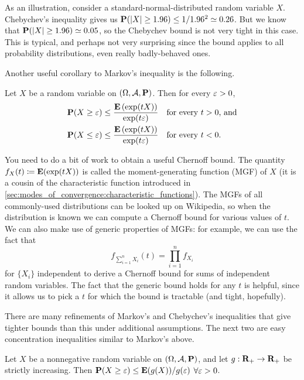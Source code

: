 \documentclass[11pt,letterpaper,reqno,oneside]{article}
\begin{document}
As an illustration, consider a standard-normal-distributed random variable $X$. Chebychev's inequality gives us $\mathbf{P}( \lvert X\rvert \geq 1.96 ) \leq 1/1.96^2 \simeq 0.26$. But we know that $\mathbf{P}( \lvert X\rvert \geq 1.96 ) \simeq 0.05$, so the Chebychev bound is not very tight in this case. This is typical, and perhaps not very surprising since the bound applies to all probability distributions, even really badly-behaved ones.


Another useful corollary to Markov's inequality is the following.
%
\begin{proposition}
	\label{proposition:Chernoff_bounds}
	Let $X$ be a random variable on $(\Omega,\mathcal{A},\mathbf{P})$. Then for every $\varepsilon>0$,
	\begin{align*}
		\mathbf{P}(X \geq \varepsilon) \leq \frac{ \mathbf{E}\left( \exp(tX) \right) }{ \exp(t\varepsilon) }
		&\quad\text{for every $t>0$, and}
		\\
		\mathbf{P}(X \leq \varepsilon) \leq \frac{ \mathbf{E}\left( \exp(tX) \right) }{ \exp(t\varepsilon) }
		&\quad\text{for every $t<0$} .
	\end{align*}
\end{proposition}
%
You need to do a bit of work to obtain a useful Chernoff bound. The quantity $f_X(t) \coloneqq \mathbf{E}(\exp(tX))$ is called the moment-generating function (MGF) of $X$ (it is a cousin of the characteristic function introduced in \cref{sec:modes_of_convergence:characteristic_functions}). The MGFs of all commonly-used distributions can be looked up on Wikipedia, so when the distribution is known we can compute a Chernoff bound for various values of $t$. We can also make use of generic properties of MGFs: for example, we can use the fact that
%
\begin{equation*}
	f_{\sum_{i=1}^n X_i}(t) = \prod_{i=1}^n f_{X_i}
\end{equation*}
%
for $\{ X_i \}$ independent to derive a Chernoff bound for sums of independent random variables. The fact that the generic bound holds for any $t$ is helpful, since it allows us to pick a $t$ for which the bound is tractable (and tight, hopefully).


There are many refinements of Markov's and Chebychev's inequalities that give tighter bounds than this under additional assumptions. The next two are easy concentration inequalities similar to Markov's above.


\begin{proposition}
	Let $X$ be a nonnegative random variable on $(\Omega,\mathcal{A},\mathbf{P})$, and let $g : \mathbf{R}_+ \to \mathbf{R}_+$ be strictly increasing. Then $\mathbf{P}( X \geq \varepsilon) \leq \mathbf{E}(g(X)) / g(\varepsilon)$ $\forall \varepsilon>0$.
\end{proposition}
\end{document}
